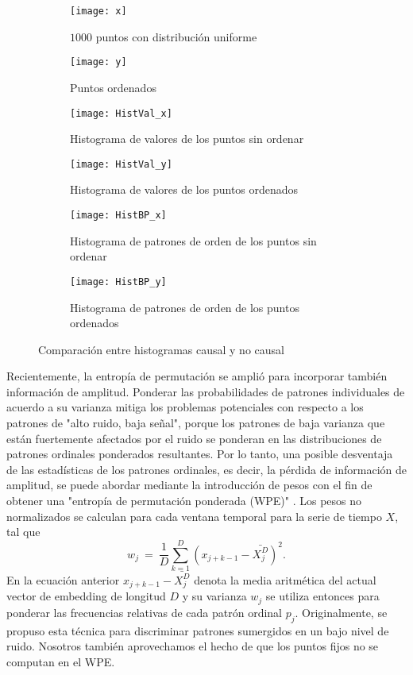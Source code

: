 \begin{figure}[htpb]
	\centering
	\begin{subfigure}[t]{0.49\textwidth}
		\texttt{[image: x]}
		\caption{$1000$ puntos con distribución uniforme}
		\label{subfig:causal_nocausal_x}
	\end{subfigure}
	\begin{subfigure}[t]{0.49\textwidth}
		\texttt{[image: y]}
		\caption{Puntos ordenados}
		\label{subfig:causal_nocausal_y}
	\end{subfigure}
	\begin{subfigure}[t]{0.49\textwidth}
		\texttt{[image: HistVal\_x]}
		\caption{Histograma de valores de los puntos sin ordenar}
		\label{subfig:causal_nocausal_HistValx}
	\end{subfigure}
	\begin{subfigure}[t]{0.49\textwidth}
		\texttt{[image: HistVal\_y]}
		\caption{Histograma de valores de los puntos ordenados}
		\label{subfig:causal_nocausal_HistValy}
	\end{subfigure}
	\begin{subfigure}[t]{0.49\textwidth}
		\texttt{[image: HistBP\_x]}
		\caption{Histograma de patrones de orden de los puntos sin ordenar}
		\label{subfig:causal_nocausal_HistBPx}
	\end{subfigure}
	\begin{subfigure}[t]{0.49\textwidth}
		\texttt{[image: HistBP\_y]}
		\caption{Histograma de patrones de orden de los puntos ordenados}
		\label{subfig:causal_nocausal_HistBPy}
	\end{subfigure}
	\caption{Comparación entre histogramas causal y no causal}\label{fig:causal_nocausal}
\end{figure}

Recientemente, la entropía de permutación se amplió para incorporar también información de amplitud.
Ponderar las probabilidades de patrones individuales de acuerdo a su varianza mitiga los problemas potenciales con respecto a los patrones de "alto ruido, baja señal", porque los patrones de baja varianza que están fuertemente afectados por el ruido se ponderan en las distribuciones de patrones ordinales ponderados resultantes.
Por lo tanto, una posible desventaja de las estadísticas de los patrones ordinales, es decir, la pérdida de información de amplitud, se puede abordar mediante la introducción de pesos con el fin de obtener una "entropía de permutación ponderada (WPE)" \cite{Fadlallah2013}.
Los pesos no normalizados se calculan para cada ventana temporal para la serie de tiempo $X$, tal que
\begin{equation}
\label{WPE_weigth}
w_j~=~\frac{1}{D}\sum_{k=1}^{D} \left(x_{j+k-1}-\bar{X_j^D}\right)^2.
\end{equation}
En la ecuación anterior $x_{j+k-1}-\bar{X_j^D}$ denota la media aritmética del actual vector de embedding de longitud $D$ y su varianza $w_j$ se utiliza entonces para ponderar las frecuencias relativas de cada patrón ordinal $p_j$.
Originalmente, se propuso esta técnica para discriminar patrones sumergidos en un bajo nivel de ruido.
Nosotros también aprovechamos el hecho de que los puntos fijos no se computan en el WPE.

